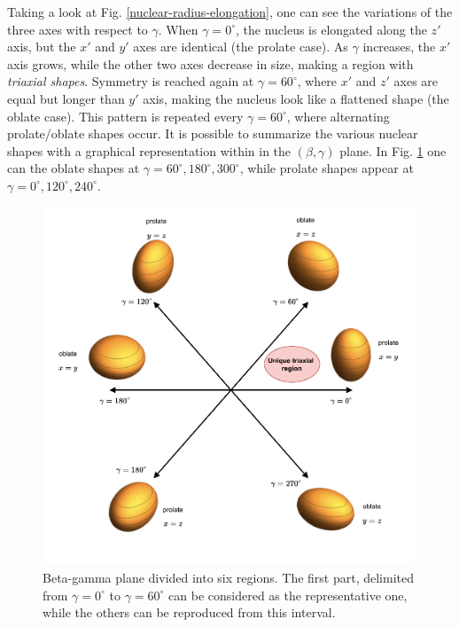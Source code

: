 Taking a look at Fig. \ref{nuclear-radius-elongation}, one can see the variations of the three axes with respect to $\gamma$. When $\gamma=0^\circ$, the nucleus is elongated along the $z'$ axis, but the $x'$ and $y'$ axes are identical (the prolate case). As $\gamma$ increases, the $x'$ axis grows, while the other two axes decrease in size, making a region with \emph{triaxial shapes}. Symmetry is reached again at $\gamma=60^\circ$, where $x'$ and $z'$ axes are equal but longer than $y'$ axis, making the nucleus look like a flattened shape (the oblate case). This pattern is repeated every $\gamma=60^\circ$, where alternating prolate/oblate shapes occur. It is possible to summarize the various nuclear shapes with a graphical representation within in the $(\beta,\gamma)$ plane. In Fig. \ref{beta-gamma-plane} one can the oblate shapes at $\gamma=60^\circ,180^\circ,300^\circ$, while prolate shapes appear at $\gamma=0^\circ,120^\circ,240^\circ$.
\begin{figure}
    \centering
    \includegraphics[width=0.99\textwidth]{Chapters/Figures/beta_gamma_plane.pdf}
    \caption{Beta-gamma plane divided into six regions. The first part, delimited from $\gamma=0^\circ$ to $\gamma=60^\circ$ can be considered as the representative one, while the others can be reproduced from this interval.}
    \label{beta-gamma-plane}
\end{figure}


